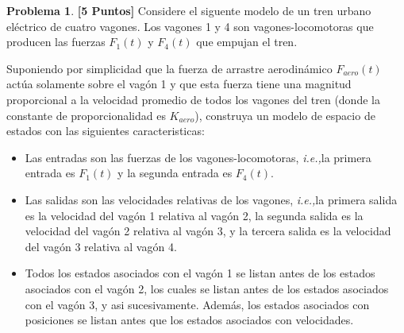 \documentclass[ a4paper, twoside, 11pt]{article}
\newcommand{\ie}{\textit{i.e.,\;}}
\theoremstyle{definition}
\newtheorem{problem}[definition]{Problema}
\begin{document}
\begin{problem}
\textbf{[5 Puntos]} Considere el siguente modelo de un tren urbano el\'ectrico de cuatro vagones. Los vagones 1 y 4 son vagones-locomotoras que producen las fuerzas $F_1(t)$ y $F_4(t)$ que empujan el tren. 
\begin{figure}[htb]
\centering
\def\svgwidth{0.8\columnwidth}

\end{figure}

Suponiendo por simplicidad que la fuerza de arrastre aerodin\'amico $F_{aero}(t)$ act\'ua solamente sobre el vag\'on 1 y que esta fuerza tiene una magnitud proporcional a la velocidad promedio de todos los vagones del tren (donde la constante de proporcionalidad es $K_{aero}$), construya un modelo de espacio de estados con las siguientes caracteristicas: 
\begin{itemize}
\item Las entradas son las fuerzas de los vagones-locomotoras, \ie la primera entrada es $F_1(t)$ y la segunda entrada es $F_4(t)$. 
\item Las salidas son las velocidades relativas de los vagones, \ie la primera salida es la velocidad del vag\'on 1 relativa al vag\'on 2, la segunda salida es la velocidad del vag\'on 2 relativa al vag\'on 3, y la tercera salida es la velocidad del vag\'on 3 relativa al vag\'on 4. 
\item Todos los estados asociados con el vag\'on 1 se listan antes de los estados asociados con el vag\'on 2, los cuales se listan antes de los estados asociados con el vag\'on 3, y asi sucesivamente. Adem\'as, los estados asociados con posiciones se listan antes que los estados asociados con velocidades. 
\end{itemize}


\end{problem}
\end{document}
